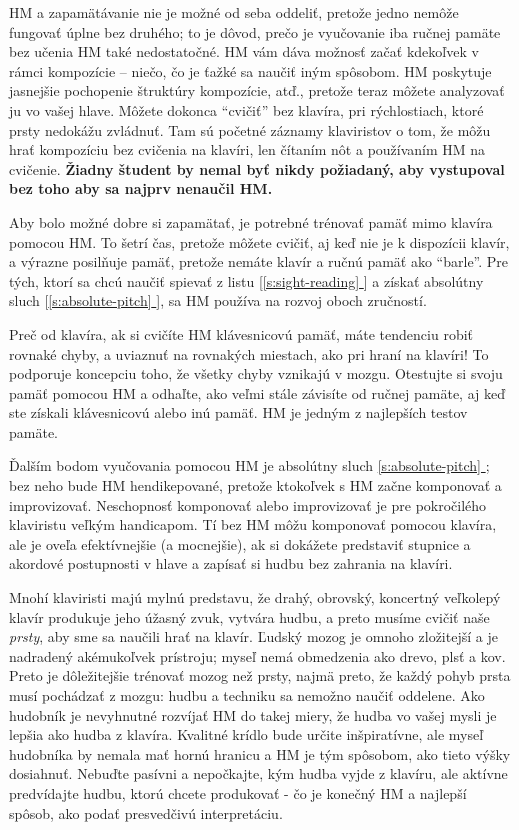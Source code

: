 \documentclass[11pt,a4paper]{book}
\newcommand*{\fullref}[1]{\hyperref[{#1}]{\ref*{#1} \nameref*{#1}}} %
\newcommand*{\fullrefp}[1]{[\fullref{#1}]} %
\begin{document}
HM a zapamätávanie nie je možné od seba oddeliť, pretože jedno nemôže fungovať úplne bez druhého; to je dôvod, prečo je vyučovanie iba ručnej pamäte bez učenia HM také nedostatočné. HM vám dáva možnosť začať kdekoľvek v rámci kompozície – niečo, čo je ťažké sa naučiť iným spôsobom. HM poskytuje jasnejšie pochopenie štruktúry kompozície, atď., pretože teraz môžete analyzovať ju vo vašej hlave. Môžete dokonca “cvičiť” bez klavíra, pri rýchlostiach, ktoré prsty nedokážu zvládnuť. Tam sú početné záznamy klaviristov o tom, že môžu hrať kompozíciu bez cvičenia na klavíri, len čítaním nôt a používaním HM na cvičenie. \textbf{Žiadny študent by nemal byť nikdy požiadaný, aby vystupoval bez toho aby sa najprv nenaučil HM.}

Aby bolo možné dobre si zapamätať, je potrebné trénovať pamäť mimo klavíra pomocou HM. To šetrí čas, pretože môžete cvičiť, aj keď nie je k dispozícii klavír, a výrazne posilňuje pamäť, pretože nemáte klavír a ručnú pamäť ako “barle”. Pre tých, ktorí sa chcú naučiť spievať z listu \fullrefp{s:sight-reading} a získať absolútny sluch \fullrefp{s:absolute-pitch}, sa HM používa na rozvoj oboch zručností.

Preč od klavíra, ak si cvičíte HM klávesnicovú pamäť, máte tendenciu robiť rovnaké chyby, a uviaznuť na rovnakých miestach, ako pri hraní na klavíri! To podporuje koncepciu toho, že všetky chyby vznikajú v mozgu. Otestujte si svoju pamäť pomocou HM a odhaľte, ako veľmi stále závisíte od ručnej pamäte, aj keď ste získali klávesnicovú alebo inú pamäť. HM je jedným z najlepších testov pamäte.

Ďalším bodom vyučovania pomocou HM je absolútny sluch \fullref{s:absolute-pitch}; bez neho bude HM hendikepované, pretože ktokoľvek s HM začne komponovať a improvizovať. Neschopnosť komponovať alebo improvizovať je pre pokročilého klaviristu veľkým handicapom. Tí bez HM môžu komponovať pomocou klavíra, ale je oveľa efektívnejšie (a mocnejšie), ak si dokážete predstaviť stupnice a akordové postupnosti v hlave a zapísať si hudbu bez zahrania na klavíri.

Mnohí klaviristi majú mylnú predstavu, že drahý, obrovský, koncertný veľkolepý klavír produkuje jeho úžasný zvuk, vytvára hudbu, a preto musíme cvičiť naše \emph{prsty}, aby sme sa naučili hrať na klavír. Ľudský mozog je omnoho zložitejší a je nadradený akémukoľvek prístroju; myseľ nemá obmedzenia ako drevo, plsť a kov. Preto je dôležitejšie trénovať mozog než prsty, najmä preto, že každý pohyb prsta musí pochádzať z mozgu: hudbu a techniku sa nemožno naučiť oddelene. Ako hudobník je nevyhnutné rozvíjať HM do takej miery, že hudba vo vašej mysli je lepšia ako hudba z klavíra. Kvalitné krídlo bude určite inšpiratívne, ale myseľ hudobníka by nemala mať hornú hranicu a HM je tým spôsobom, ako tieto výšky dosiahnuť. Nebuďte pasívni a nepočkajte, kým hudba vyjde z klavíru, ale aktívne predvídajte hudbu, ktorú chcete produkovať - čo je konečný HM a najlepší spôsob, ako podať  presvedčivú interpretáciu.
\end{document}
